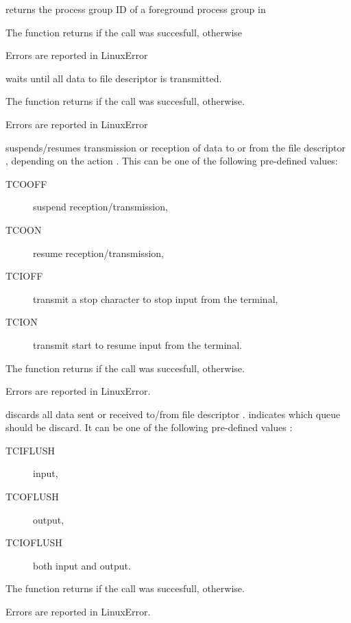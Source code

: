 { 
  returns the process group ID of a foreground process group in  

  The function returns  if the call was succesfull, 
  otherwise
}
{Errors are reported in LinuxError}
{}

{ 
  waits until all data to file descriptor  is transmitted.
  
  The function returns  if the call was succesfull, 
  otherwise.
}
{Errors are reported in LinuxError}
{}

{ 
  suspends/resumes transmission or reception of data to or from the file
descriptor , depending
  on the action . This can be one of the following pre-defined
values: 
\begin{description}
\item [TCOOFF\ ] suspend reception/transmission,
\item [TCOON\ ] resume  reception/transmission,
\item [TCIOFF\ ] transmit a stop character to stop input from the terminal, 
\item [TCION\ ] transmit start to resume input from the terminal.
\end{description}

The function returns  if the call was succesfull, 
otherwise.
}
{Errors are reported in LinuxError.}
{}

{ 
  discards all data sent or received to/from file descriptor . 
  indicates which queue
  should be discard. It can be one of the following pre-defined values :
\begin{description}
\item [TCIFLUSH\ ] input,
\item [TCOFLUSH\ ] output,
\item [TCIOFLUSH\ ] both input and output.
\end{description}

The function returns  if the call was succesfull, 
otherwise.
}
{Errors are reported in LinuxError.}
{}

